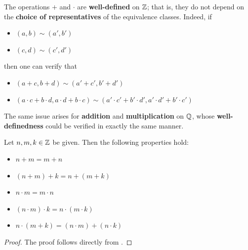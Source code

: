 \bigskip

\begin{remark}
    The operations $+$ and $\cdot$ are \textbf{well-defined} on $\mathbb{Z}$; that is, they do not
    depend on the \textbf{choice of representatives} of the equivalence classes. Indeed, if
    \begin{itemize}
        \item $(a, b) \sim (a', b')$
        \item $(c, d) \sim (c', d')$
    \end{itemize}
    then one can verify that
    \begin{itemize}
        \item $(a + c, b + d) \sim (a' + c', b' + d')$
        \item $(a \cdot c + b \cdot d, a \cdot d + b \cdot c) \sim (a' \cdot c' + b' \cdot d', a' \cdot d' + b' \cdot c')$
    \end{itemize}
    The same issue arises for \textbf{addition} and \textbf{multiplication} on $\mathbb{Q}$,
    whose \textbf{well-definedness} could be verified in exactly the same manner.
\end{remark}

\bigskip

\begin{theorem} \label{an:thm:properties-of-operations-on-Z}
    Let $n, m, k \in \mathbb{Z}$ be given. Then the following properties hold:
    \begin{itemize}
        \item $n + m = m + n$
        \item $(n + m) + k = n + (m + k)$
        \item $n \cdot m = m \cdot n$
        \item $(n \cdot m) \cdot k = n \cdot (m \cdot k)$
        \item $n \cdot (m + k) = (n \cdot m) + (n \cdot k)$
    \end{itemize}
\end{theorem}

\begin{proof}
    The proof follows directly from .
\end{proof}

\bigskip

